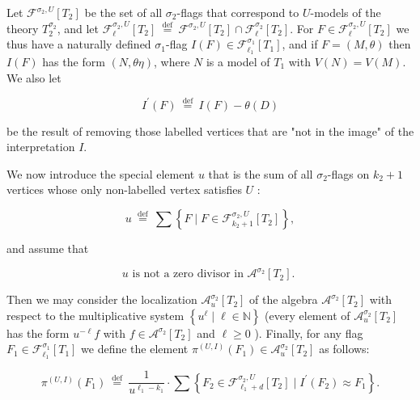 \documentclass[10pt]{article}
\begin{document}
Let $\mathcal{F}^{\sigma_{2}, U}\left[T_{2}\right]$ be the set of all $\sigma_{2}$-flags that correspond to $U$-models of the theory $T_{2}^{\sigma_{2}}$, and let $\mathcal{F}_{\ell}^{\sigma_{2}, U}\left[T_{2}\right] \stackrel{\text { def }}{=} \mathcal{F}^{\sigma_{2}, U}\left[T_{2}\right] \cap \mathcal{F}_{\ell}^{\sigma_{2}}\left[T_{2}\right]$. For $F \in \mathcal{F}_{\ell}^{\sigma_{2}, U}\left[T_{2}\right]$ we thus have a naturally defined $\sigma_{1}$-flag $I(F) \in \mathcal{F}_{\ell_{1}}^{\sigma_{1}}\left[T_{1}\right]$, and if $F=(M, \theta)$ then $I(F)$ has the form $(N, \theta \eta)$, where $N$ is a model of $T_{1}$ with $V(N)=V(M)$. We also let

$$
I^{\prime}(F) \stackrel{\text { def }}{=} I(F)-\theta(D)
$$

be the result of removing those labelled vertices that are "not in the image" of the interpretation $I$.

We now introduce the special element $u$ that is the sum of all $\sigma_{2}$-flags on $k_{2}+1$ vertices whose only non-labelled vertex satisfies $U$ :


\begin{equation*}
u \stackrel{\text { def }}{=} \sum\left\{F \mid F \in \mathcal{F}_{k_{2}+1}^{\sigma_{2}, U}\left[T_{2}\right]\right\}, \tag{8}
\end{equation*}


and assume that


\begin{equation*}
u \text { is not a zero divisor in } \mathcal{A}^{\sigma_{2}}\left[T_{2}\right] \text {. } \tag{9}
\end{equation*}


Then we may consider the localization $\mathcal{A}_{u}^{\sigma_{2}}\left[T_{2}\right]$ of the algebra $\mathcal{A}^{\sigma_{2}}\left[T_{2}\right]$ with respect to the multiplicative system $\left\{u^{\ell} \mid \ell \in \mathbb{N}\right\}$ (every element of $\mathcal{A}_{u}^{\sigma_{2}}\left[T_{2}\right]$ has the form $u^{-\ell} f$ with $f \in \mathcal{A}^{\sigma_{2}}\left[T_{2}\right]$ and $\ell \geq 0$ ). Finally, for any flag $F_{1} \in \mathcal{F}_{\ell_{1}}^{\sigma_{1}}\left[T_{1}\right]$ we define the element $\pi^{(U, I)}\left(F_{1}\right) \in \mathcal{A}_{u}^{\sigma_{2}}\left[T_{2}\right]$ as follows:

$$
\pi^{(U, I)}\left(F_{1}\right) \stackrel{\text { def }}{=} \frac{1}{u^{\ell_{1}-k_{1}}} \cdot \sum\left\{F_{2} \in \mathcal{F}_{\ell_{1}+d}^{\sigma_{2}, U}\left[T_{2}\right] \mid I^{\prime}\left(F_{2}\right) \approx F_{1}\right\} .
$$
\end{document}
